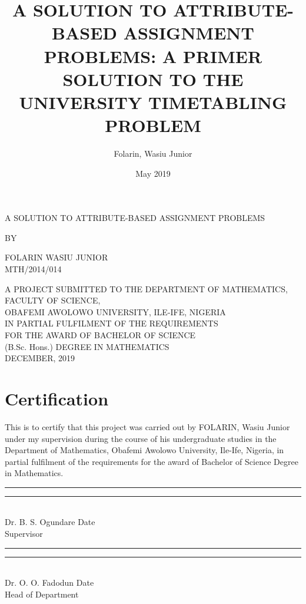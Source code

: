 \documentclass[a4paper,openany]{book}
\title{A SOLUTION TO ATTRIBUTE-BASED ASSIGNMENT PROBLEMS: A PRIMER SOLUTION TO THE UNIVERSITY TIMETABLING PROBLEM}
\date{May 2019}
\author{Folarin, Wasiu Junior}
\begin{document}
	\linespread{1.6}
	\large
	\setlength{\biblabelsep}{0.3em}
	\makeatletter
	\renewcommand{\@biblabel}[1]{\stepcounter{MyBibCount}\theMyBibCount. }
	\makeatother
	\frontmatter
	\begin{titlepage}
		\begin{center}
			A SOLUTION TO ATTRIBUTE-BASED ASSIGNMENT PROBLEMS%
		\end{center}
		\vfill
		\begin{center}
			BY
		\end{center}
		\vfill
		\begin{center}
			FOLARIN WASIU JUNIOR\\[0.25in]
			MTH/2014/014
		\end{center}
		\vfill
		\begin{center}
			A PROJECT SUBMITTED TO THE DEPARTMENT OF MATHEMATICS, FACULTY OF SCIENCE,\\
			OBAFEMI AWOLOWO UNIVERSITY, ILE-IFE, NIGERIA\\
			IN PARTIAL FULFILMENT OF THE REQUIREMENTS\\
			FOR THE AWARD OF BACHELOR OF SCIENCE\\
			(B.Sc. Hons.) DEGREE IN MATHEMATICS\\ \bigskip
			DECEMBER, 2019
		\end{center}
	\end{titlepage}
	\chapter[Certification]{\centering Certification}
	This is to certify that this project was carried out by FOLARIN, Wasiu Junior under my supervision during the course of his undergraduate studies in the Department of Mathematics, Obafemi Awolowo University, Ile-Ife, Nigeria, in partial fulfilment of the requirements for the award of Bachelor of Science Degree in Mathematics.
	\\[1in]
	\rule{1.5in}{0.1pt} \hfill \rule{1in}{0.4pt}
	\\[2ex]
	Dr. B. S. Ogundare \hfill Date \hspace{4ex}
	\\[1ex]
	Supervisor
	\\[1.5in]
	\rule{1.5in}{0.1pt} \hfill \rule{1in}{0.4pt}
	\\[2ex]
	Dr. O. O. Fadodun \hfill Date \hspace{4ex}
	\\[1ex]
	Head of Department
	
\end{document}
